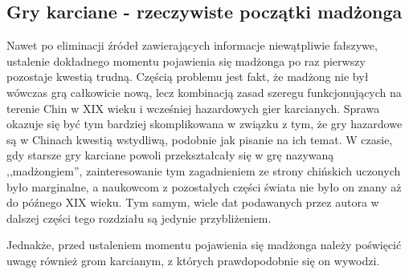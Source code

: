 \subsection{Gry karciane - rzeczywiste początki madżonga}
Nawet po eliminacji źródeł zawierających informacje niewątpliwie fałszywe,
ustalenie dokładnego momentu pojawienia się madżonga po raz pierwszy pozostaje
kwestią trudną. Częścią problemu jest fakt, że madżong nie był wówczas grą
całkowicie nową, lecz kombinacją zasad szeregu funkcjonujących na terenie Chin w
XIX wieku i wcześniej hazardowych gier karcianych. Sprawa okazuje się być tym
bardziej skomplikowana w związku z tym, że gry hazardowe są w Chinach kwestią
wstydliwą, podobnie jak pisanie na ich temat. W czasie, gdy starsze gry karciane
powoli przekształcały się w grę nazywaną ,,madżongiem'', zainteresowanie tym
zagadnieniem ze strony chińskich uczonych było marginalne, a naukowcom z
pozostałych części świata nie było on znany aż do późnego XIX wieku.
Tym samym, wiele dat podawanych przez autora w dalszej części tego rozdziału są
jedynie przybliżeniem.

Jednakże, przed ustaleniem momentu pojawienia się madżonga należy poświęcić
uwagę również grom karcianym, z których prawdopodobnie się on wywodzi.

